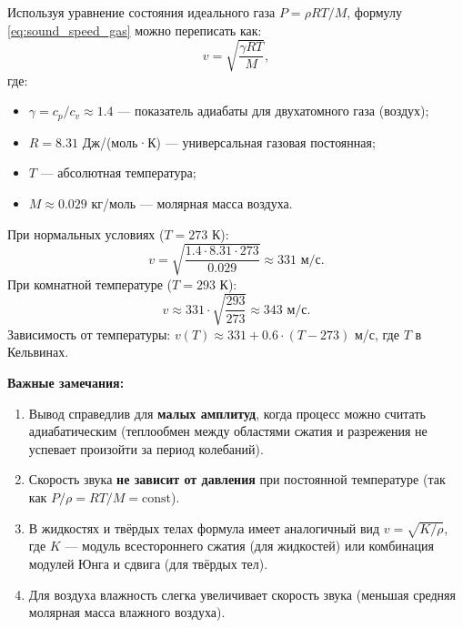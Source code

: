 \begin{property}
Используя уравнение состояния идеального газа $P = \rho R T / M$, формулу \eqref{eq:sound_speed_gas} можно переписать как:
\begin{equation}
    v = \sqrt{\frac{\gamma R T}{M}}, \label{eq:sound_temp}
\end{equation}
где:
\begin{itemize}
    \item $\gamma = c_p/c_v \approx 1.4$ --- показатель адиабаты для двухатомного газа (воздух);
    \item $R = 8.31$ Дж/(моль·К) --- универсальная газовая постоянная;
    \item $T$ --- абсолютная температура;
    \item $M \approx 0.029$ кг/моль --- молярная масса воздуха.
\end{itemize}
При нормальных условиях ($T = 273$ К):
\begin{equation}
    v = \sqrt{\frac{1.4 \cdot 8.31 \cdot 273}{0.029}} \approx 331 \text{ м/с}.
\end{equation}
При комнатной температуре ($T = 293$ К):
\begin{equation}
    v \approx 331 \cdot \sqrt{\frac{293}{273}} \approx 343 \text{ м/с}.
\end{equation}
Зависимость от температуры: $v(T) \approx 331 + 0.6 \cdot (T - 273)$ м/с, где $T$ в Кельвинах.
\end{property}

\begin{remark}
\textbf{Важные замечания:}
\begin{enumerate}
    \item Вывод справедлив для \textbf{малых амплитуд}, когда процесс можно считать адиабатическим (теплообмен между областями сжатия и разрежения не успевает произойти за период колебаний).
    \item Скорость звука \textbf{не зависит от давления} при постоянной температуре (так как $P/\rho = RT/M = \text{const}$).
    \item В жидкостях и твёрдых телах формула имеет аналогичный вид $v = \sqrt{K/\rho}$, где $K$ --- модуль всестороннего сжатия (для жидкостей) или комбинация модулей Юнга и сдвига (для твёрдых тел).
    \item Для воздуха влажность слегка увеличивает скорость звука (меньшая средняя молярная масса влажного воздуха).
\end{enumerate}
\end{remark}
